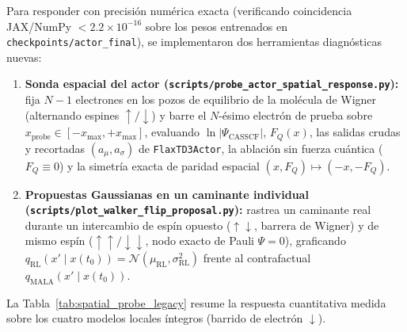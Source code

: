 \documentclass[10pt,a4paper]{article}
\begin{document}
Para responder con precisión numérica exacta (verificando coincidencia JAX/NumPy $< 2.2\times 10^{-16}$ sobre los pesos entrenados en \texttt{checkpoints/actor\_final}), se implementaron dos herramientas diagnósticas nuevas:
\begin{enumerate}
\item \textbf{Sonda espacial del actor (\texttt{scripts/probe\_actor\_spatial\_response.py}):} fija $N-1$ electrones en los pozos de equilibrio de la molécula de Wigner (alternando espines $\uparrow/\downarrow$) y barre el $N$-ésimo electrón de prueba sobre $x_{\mathrm{probe}} \in [-x_{\max}, +x_{\max}]$, evaluando $\ln|\Psi_{\mathrm{CASSCF}}|$, $F_Q(x)$, las salidas crudas y recortadas $(a_\mu, a_\sigma)$ de \texttt{FlaxTD3Actor}, la ablación sin fuerza cuántica ($F_Q \equiv 0$) y la simetría exacta de paridad espacial $(x, F_Q) \mapsto (-x, -F_Q)$.
\item \textbf{Propuestas Gaussianas en un caminante individual (\texttt{scripts/plot\_walker\_flip\_proposal.py}):} rastrea un caminante real durante un intercambio de espín opuesto ($\uparrow\downarrow$, barrera de Wigner) y de mismo espín ($\uparrow\uparrow/\downarrow\downarrow$, nodo exacto de Pauli $\Psi=0$), graficando $q_{\mathrm{RL}}(x'\mid x(t_0)) = \mathcal{N}(\mu_{\mathrm{RL}}, \sigma_{\mathrm{RL}}^2)$ frente al contrafactual $q_{\mathrm{MALA}}(x'\mid x(t_0))$.
\end{enumerate}

La Tabla~\ref{tab:spatial_probe_legacy} resume la respuesta cuantitativa medida sobre los cuatro modelos locales íntegros (barrido de electrón $\downarrow$).
\end{document}

